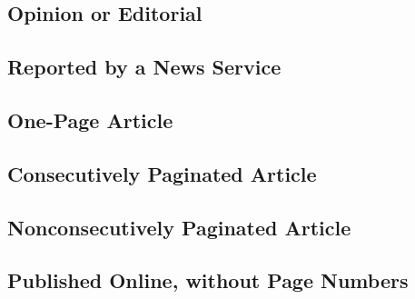 \documentclass{article}
\begin{document}
\subsection{Opinion or Editorial} %
\label{sub:opinion_or_editorial}
\begin{refsection}
	\printbibliography[heading=none]
\end{refsection}
\subsection{Reported by a News Service} %
\label{sub:reported_by_a_news_service}
\begin{refsection}
	\printbibliography[heading=none]
\end{refsection}
\subsection{One-Page Article} %
\label{sub:one_page_article}
\begin{refsection}
	\printbibliography[heading=none]
\end{refsection}
\subsection{Consecutively Paginated Article} %
\label{sub:consecutively_paginated_article}
\begin{refsection}
	\printbibliography[heading=none]
\end{refsection}
\subsection{Nonconsecutively Paginated Article} %
\label{sub:nonconsecutively_paginated_article}
\begin{refsection}
	\printbibliography[heading=none]
\end{refsection}
\subsection{Published Online, without Page Numbers} %
\label{sub:published_online_without_page_numbers}
\begin{refsection}
	\printbibliography[heading=none]
\end{refsection}
\end{document}
